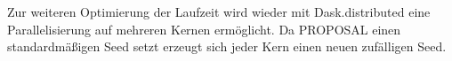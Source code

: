 
 Zur weiteren Optimierung der Laufzeit wird wieder mit Dask.distributed 
 eine Parallelisierung auf mehreren Kernen ermöglicht. Da PROPOSAL einen standardmäßigen
 Seed setzt erzeugt sich jeder Kern einen neuen zufälligen Seed.